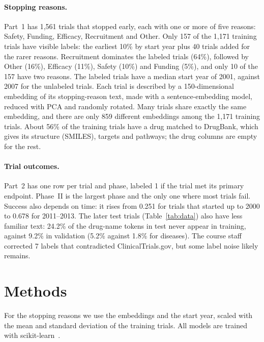 \documentclass[10pt,twocolumn,letterpaper]{article}
\begin{document}
\paragraph{Stopping reasons.}
Part~1 has 1{,}561 trials that stopped early, each with one or more of five reasons: Safety, Funding, Efficacy, Recruitment and Other.
Only 157 of the 1{,}171 training trials have visible labels: the earliest 10\% by start year plus 40 trials added for the rarer reasons.
Recruitment dominates the labeled trials (64\%), followed by Other (16\%), Efficacy (11\%), Safety (10\%) and Funding (5\%), and only 10 of the 157 have two reasons.
The labeled trials have a median start year of 2001, against 2007 for the unlabeled trials.
Each trial is described by a 150-dimensional embedding of its stopping-reason text, made with a sentence-embedding model, reduced with PCA and randomly rotated.
Many trials share exactly the same embedding, and there are only 859 different embeddings among the 1{,}171 training trials.
About 56\% of the training trials have a drug matched to DrugBank, which gives its structure (SMILES), targets and pathways; the drug columns are empty for the rest.

\paragraph{Trial outcomes.}
Part~2 has one row per trial and phase, labeled 1 if the trial met its primary endpoint.
Phase~II is the largest phase and the only one where most trials fail.
Success also depends on time: it rises from 0.251 for trials that started up to 2000 to 0.678 for 2011--2013.
The later test trials (Table~\ref{tab:data}) also have less familiar text: 24.2\% of the drug-name tokens in test never appear in training, against 9.2\% in validation (5.2\% against 1.8\% for diseases).
The course staff corrected 7 labels that contradicted ClinicalTrials.gov, but some label noise likely remains.

\section{Methods}
For the stopping reasons we use the embeddings and the start year, scaled with the mean and standard deviation of the training trials.
All models are trained with scikit-learn~\cite{pedregosa2011scikit}.
\end{document}
